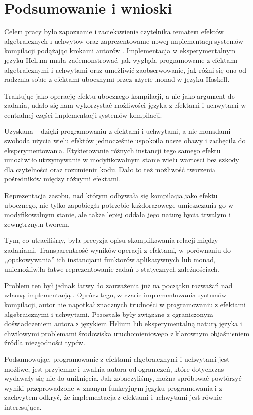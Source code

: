 
\chapter{Podsumowanie i wnioski}

Celem pracy było zapoznanie i zaciekawienie czytelnika tematem efektów algebraicznych i uchwytów oraz zaprezentowanie nowej implementacji systemów kompilacji podążając krokami autorów \BSaLC{}. Implementacja w eksperymentalnym języku Helium miała zademonstrować, jak wygląda programowanie z efektami algebraicznymi i uchwytami oraz umożliwić zaobserwowanie, jak różni się ono od radzenia sobie z efektami ubocznymi przez użycie monad w języku Haskell.

Traktując  jako operację efektu ubocznego kompilacji, a nie jako argument do zadania, udało się nam wykorzystać możliwości języka z efektami i uchwytami w centralnej części implementacji systemów kompilacji.

Uzyskana -- dzięki programowaniu z efektami i uchwytami, a nie monadami -- swoboda użycia wielu efektów jednocześnie uspokoiła nasze obawy i zachęciła do eksperymentowania. Etykietowanie różnych instancji tego samego efektu umożliwiło utrzymywanie w modyfikowalnym stanie wielu wartości bez szkody dla czytelności oraz rozumieniu kodu. Dało to też możliwość tworzenia pośredników między różnymi efektami. %

Reprezentacja zasobu, nad którym odbywała się kompilacja jako efektu ubocznego, nie tylko zapobiegła potrzebie każdorazowego umieszczania go w modyfikowalnym stanie, ale także lepiej oddała jego naturę bycia trwałym i zewnętrznym tworem.

Tym, co utraciliśmy, była precyzja opisu skomplikowania relacji między zadaniami. Transparentność wyników operacji z efektami, w porównaniu do ,,opakowywania'' ich instancjami funktorów aplikatywnych lub monad, uniemożliwiła łatwe reprezentowanie zadań o statycznych zależnościach.

Problem ten był jednak łatwy do zauważenia już na początku rozważań nad własną implementacją \BSaLC{}. Oprócz tego, w czasie implementowania systemów kompilacji, autor nie napotkał znacznych trudności w programowaniu z efektami algebraicznymi i uchwytami. Pozostałe były związane z ograniczonym doświadczeniem autora z językiem Helium lub eksperymentalną naturą języka i chwilowymi problemami środowiska uruchomieniowego z klarownym objaśnieniem źródła niezgodności typów.

Podsumowując, programowanie z efektami algebraicznymi i uchwytami jest możliwe, jest przyjemne i uwalnia autora od ograniczeń, które dotychczas wydawały się nie do uniknięcia. Jak zobaczyliśmy, można spróbować powtórzyć wyniki przeprowadzone w znanym funkcyjnym języku programowania i z zachwytem odkryć, że implementacja z efektami i uchwytami jest równie interesująca.
